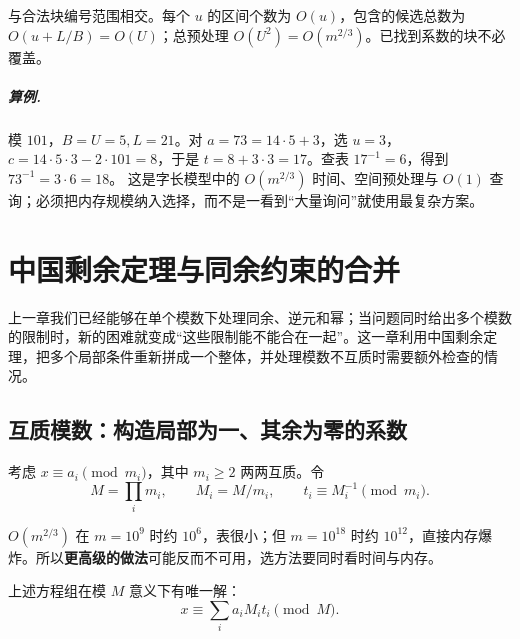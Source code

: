 与合法块编号范围相交。每个 $u$ 的区间个数为 $O(u)$，包含的候选总数为 $O(u+L/B)=O(U)$；总预处理 $O(U^2)=O(m^{2/3})$。已找到系数的块不必覆盖。

\paragraph{算例.} 模 $101$，$B=U=5,L=21$。对 $a=73=14\cdot5+3$，选 $u=3$，$c=14\cdot5\cdot3-2\cdot101=8$，于是 $t=8+3\cdot3=17$。查表 $17^{-1}=6$，得到 $73^{-1}=3\cdot6=18$。
\cost 这是字长模型中的 $O(m^{2/3})$ 时间、空间预处理与 $O(1)$ 查询；必须把内存规模纳入选择，而不是一看到“大量询问”就使用最复杂方案。



\chapter{中国剩余定理与同余约束的合并}
\begin{chapterintro}[章节导读]
上一章我们已经能够在单个模数下处理同余、逆元和幂；当问题同时给出多个模数的限制时，新的困难就变成“这些限制能不能合在一起”。这一章利用中国剩余定理，把多个局部条件重新拼成一个整体，并处理模数不互质时需要额外检查的情况。
\end{chapterintro}

\section{互质模数：构造局部为一、其余为零的系数}
考虑 $x\equiv a_i\pmod{m_i}$，其中 $m_i\ge2$ 两两互质。令
\[
 M=\prod_i m_i,\qquad M_i=M/m_i,\qquad t_i\equiv M_i^{-1}\pmod{m_i}.
\]

\begin{tip}
$O(m^{2/3})$ 在 $m=10^9$ 时约 $10^6$，表很小；但 $m=10^{18}$ 时约 $10^{12}$，直接内存爆炸。所以\textbf{更高级的做法}可能反而不可用，选方法要同时看时间与内存。
\end{tip}

\begin{theorem}[中国剩余定理]
上述方程组在模 $M$ 意义下有唯一解：
\[
 x\equiv\sum_i a_iM_it_i\pmod M.
\]
\end{theorem}

